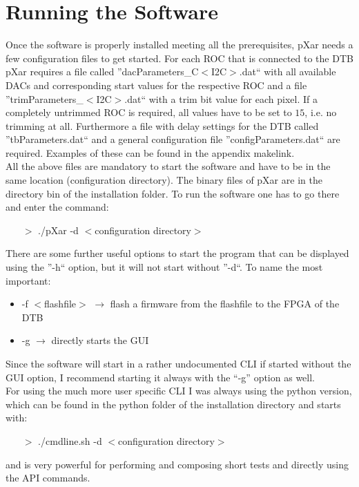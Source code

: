 \documentclass[british,11pt,a4paper]{memoir}
\begin{document}
\section{Running the Software}
Once the software is properly installed meeting all the prerequisites, pXar needs a few configuration files to get started. For each \ac{ROC} that is connected to the \ac{DTB} pXar requires a file called ''dacParameters\_C$<$\ac{I2C}$>$.dat`` with all available \ac{DAC}s and corresponding start values for the respective \ac{ROC} and a file ''trimParameters\_$<$\ac{I2C}$>$.dat`` with a trim bit value for each pixel. If a completely untrimmed \ac{ROC} is required, all values have to be set to $15$, i.e. no trimming at all. Furthermore a file with delay settings for the \ac{DTB} called ''tbParameters.dat`` and a general configuration file ''configParameters.dat`` are required. Examples of these can be found in the appendix \ac{makelink}.\\
All the above files are mandatory to start the software and have to be in the same location (configuration directory). The binary files of pXar are in the directory bin of the installation folder. To run the software one has to go there and enter the command:
\begin{itemize}
	\item[$>$] ./pXar -d $<$configuration directory$>$
\end{itemize}
There are some further useful options to start the program that can be displayed using the ''-h`` option, but it will not start without ''-d``. To name the most important:
\begin{itemize}
	\item -f $<$flashfile$>$ \ka $\rightarrow$ flash a firmware from the flashfile to the \ac{FPGA} of the \ac{DTB}
	\item -g \ka $\rightarrow$ directly starts the \ac{GUI}
\end{itemize}
Since the software will start in a rather undocumented \ac{CLI} if started without the \ac{GUI} option, I recommend starting it always with the ``-g'' option as well.\\
For using the much more user specific \ac{CLI} I was always using the python version, which can be found in the python folder of the installation directory and starts with:
\begin{itemize}
	\item[$>$] ./cmdline.sh -d $<$configuration directory$>$
\end{itemize}
and is very powerful for performing and composing short tests and directly using the \ac{API} commands.
\end{document}
